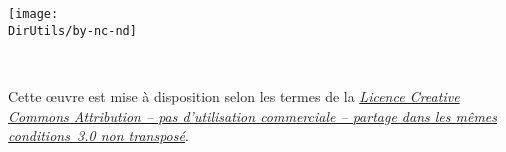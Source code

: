 \noindent\texttt{[image: \\DirUtils/by-nc-nd]}

\noindent\textcopyright~\SL

\noindent Cette {\oe}uvre est mise à disposition selon les termes 
de la \href{http://creativecommons.org/licenses/by-nc-sa/3.0/}
{\em Licence Creative Commons Attribution -- pas d'utilisation 
commerciale -- partage dans les mêmes conditions~3.0 non transposé}.
